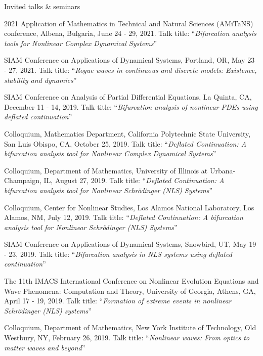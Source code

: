 \documentclass[10pt]{article} %
\begin{document}
\begin{section}{Invited talks \& seminars}
\begin{etaremune}
\item 2021 Application of Mathematics in Technical and Natural Sciences (AMiTaNS) conference, Albena, Bulgaria, June 24 - 29, 2021.
Talk title: ``\textit{Bifurcation analysis tools for Nonlinear Complex Dynamical Systems}''

\item SIAM Conference on Applications of Dynamical Systems, Portland, OR, May 23 - 27, 2021. Talk title: 
``\textit{Rogue waves in continuous and discrete models: Existence, stability and dynamics}''

\item SIAM Conference on Analysis of Partial Differential Equations, La Quinta, CA, December 11 - 14, 2019. 
Talk title: ``\textit{Bifurcation analysis of nonlinear PDEs using deflated continuation}''

\item Colloquium, Mathematics Department, California Polytechnic State University, San Luis Obispo, CA, October 25, 2019. 
Talk title: ``\textit{Deflated Continuation: A bifurcation analysis tool for Nonlinear Complex Dynamical Systems}''  

\item Colloquium, Department of Mathematics, University of Illinois at Urbana-Champaign, IL, August 27, 2019.
      Talk title: ``\textit{Deflated Continuation: A bifurcation analysis tool for Nonlinear Schr\"odinger (NLS) Systems}''

\item Colloquium, Center for Nonlinear Studies, Los Alamos National Laboratory, Los Alamos, NM, July 12, 2019. 
      Talk title: ``\textit{Deflated Continuation: A bifurcation analysis tool for Nonlinear Schr\"odinger (NLS) Systems}''
       
\item SIAM Conference on Applications of Dynamical Systems, Snowbird, UT, May 19 - 23, 2019. Talk title: 
                    ``\textit{Bifurcation analysis in NLS systems using deflated continuation}''

\item The 11th IMACS International Conference on Nonlinear Evolution Equations and Wave Phenomena: Computation and Theory, %
        University of Georgia, Athens, GA, April 17 - 19, 2019. 
        Talk title: ``\textit{Formation of extreme events in nonlinear Schr\"odinger (NLS) systems}''

\item  Colloquium, Department of Mathematics, New York Institute of Technology, Old Westbury, NY, February 26, 2019.
       Talk title: ``\textit{Nonlinear waves: From optics to matter waves and beyond}''          
        

\end{etaremune}
\end{section}
\end{document}
